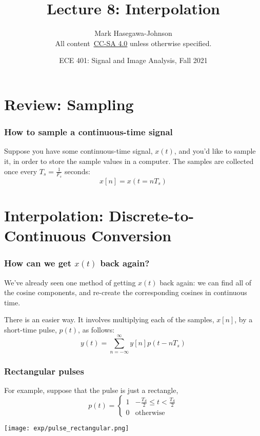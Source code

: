 \documentclass{beamer}
\title{Lecture 8: Interpolation}
\author{Mark Hasegawa-Johnson\\All content~\href{https://creativecommons.org/licenses/by-sa/4.0/}{CC-SA 4.0} unless otherwise specified.}
\date{ECE 401: Signal and Image Analysis, Fall 2021}
\begin{document}
\begin{frame}
  \maketitle
\end{frame}

\begin{frame}
  \tableofcontents
\end{frame}

\section[Sampling]{Review: Sampling}
\setcounter{subsection}{1}

\begin{frame}
  \frametitle{How to sample a continuous-time signal}

  Suppose you have some continuous-time signal, $x(t)$, and you'd like
  to sample it, in order to store the sample values in a computer.
  The samples are collected once every $T_s=\frac{1}{F_s}$ seconds:
  \begin{displaymath}
    x[n] = x(t=nT_s)
  \end{displaymath}
\end{frame}

\section[Interpolation]{Interpolation: Discrete-to-Continuous Conversion}
\setcounter{subsection}{1}

\begin{frame}
  \frametitle{How can we get $x(t)$ back again?}

  We've already seen one method of getting $x(t)$ back again: we can
  find all of the cosine components, and re-create the corresponding
  cosines in continuous time.

  There is an easier way.  It involves multiplying each of the
  samples, $x[n]$, by a short-time pulse, $p(t)$, as follows:
  \begin{displaymath}
    y(t) = \sum_{n=-\infty}^\infty y[n]p(t-nT_s)
  \end{displaymath}
\end{frame}

\begin{frame}
  \frametitle{Rectangular pulses}

  For example, suppose that the pulse is  just a  rectangle,
  \begin{displaymath}
    p(t) = \begin{cases}
      1 & -\frac{T_S}{2}\le t<\frac{T_S}{2}\\
      0 & \mbox{otherwise}
    \end{cases}
  \end{displaymath}

  \centerline{\texttt{[image: exp/pulse\_rectangular.png]}}  
\end{frame}
\end{document}
